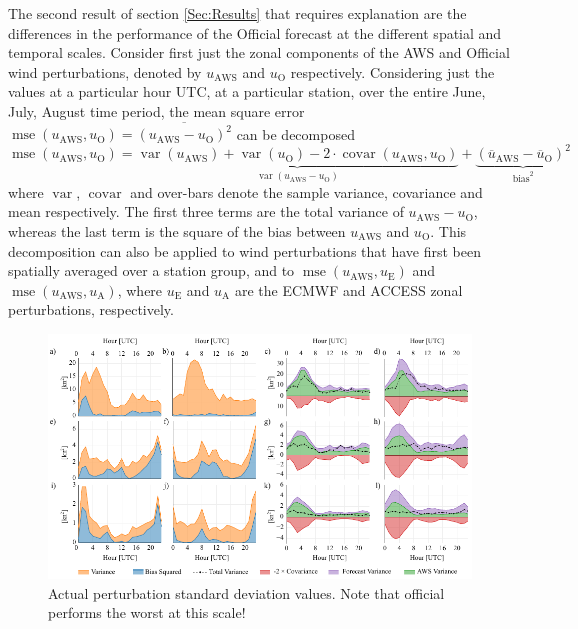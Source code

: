 \documentclass{ametsoc}
\DeclareMathOperator{\mse}{mse}
\DeclareMathOperator{\covar}{covar}
\DeclareMathOperator{\var}{var}
\begin{document}
The second result of section \ref{Sec:Results} that requires explanation are the differences in the performance of the Official forecast at the different spatial and temporal scales. Consider first just the zonal components of the AWS and Official wind perturbations, denoted by $u_\text{AWS}$ and $u_\text{O}$ respectively. Considering just the values at a particular hour UTC, at a particular station, over the entire June, July, August time period, the mean square error  $\mse\left(u_\text{AWS}, u_\text{O}\right) = \overline{\left(u_\text{AWS} - u_\text{O}\right)^2}$ can be decomposed
\begin{equation}
\mse\left(u_\text{AWS}, u_\text{O}\right) = \underbrace{\var\left(u_\text{AWS}\right) + \var\left(u_\text{O}\right) - 2 \cdot \covar\left(u_\text{AWS}, u_\text{O}\right)}_{\var\left(u_\text{AWS} - u_\text{O}\right)} + \underbrace{\left(\overline{u}_\text{AWS} - \overline{u}_\text{O}\right)^2}_{\text{bias}^2} \label{Eq:MSE}
\end{equation}
where $\var$, $\covar$ and over-bars denote the sample variance, covariance and mean respectively. The first three terms are the total variance of $u_\text{AWS} - u_\text{O}$, whereas the last term is the square of the bias between $u_\text{AWS}$ and $u_\text{O}$. This decomposition can also be applied to wind perturbations that have first been spatially averaged over a station group, and to $\mse\left(u_\text{AWS}, u_\text{E}\right)$ and $\mse\left(u_\text{AWS}, u_\text{A}\right)$, where $u_\text{E}$ and $u_\text{A}$ are the ECMWF and ACCESS zonal perturbations, respectively. 

\begin{figure}
\centering
\includegraphics[width=39pc]{error_decomp.pdf}
\caption{Actual perturbation standard deviation values. Note that official performs the worst at this scale!}
\label{Fig:error_decomp}
\end{figure}
\end{document}
